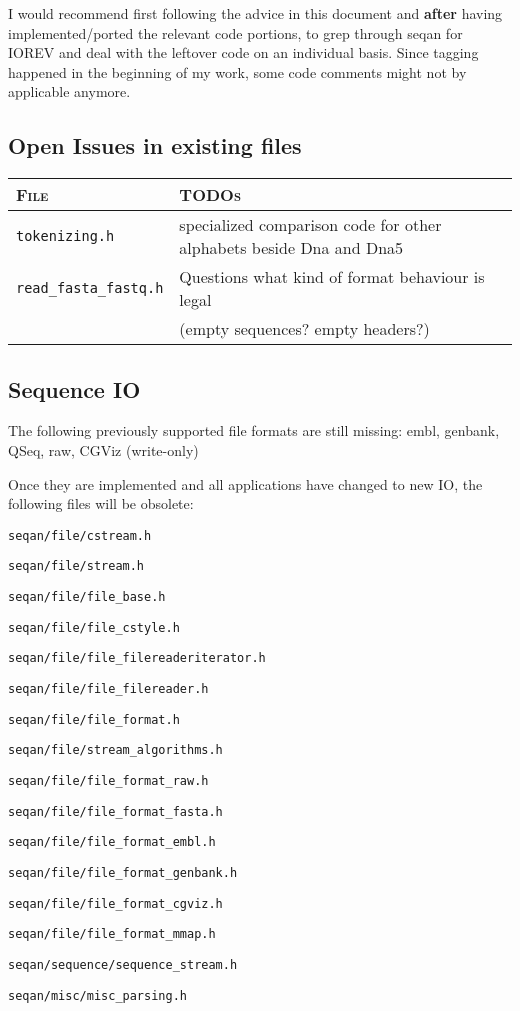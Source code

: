 \documentclass[a4paper,12pt]{scrartcl}
\newenvironment{packed_enum}{
\begin{enumerate}
  \setlength{\itemsep}{1pt}
  \setlength{\parskip}{0pt}
  \setlength{\parsep}{0pt}
}{\end{enumerate}}
\begin{document}
I would recommend first following the advice in this document and \textbf{after}
having
implemented/ported the relevant code portions, to grep through seqan for IOREV
and deal with the leftover code on an individual basis. Since tagging happened
in the beginning of my work, some code comments might not by applicable anymore.


\subsection{Open Issues in existing files}

\begin{tabular}{ll}\toprule
\textsc{File}	& \textsc{TODOs}		\\\midrule
\verb#tokenizing.h#    &specialized comparison code for other alphabets beside Dna and Dna5\\
\verb#read_fasta_fastq.h#     &Questions what kind of format behaviour is legal \\
&(empty sequences? empty headers?) \\\bottomrule
\end{tabular}





\subsection{Sequence IO}

The following previously supported file formats are still missing: embl, genbank, QSeq, raw, CGViz (write-only)

Once they are implemented and all applications have changed to new IO, the following 
files will be obsolete:
\begin{packed_enum}
\item \verb#seqan/file/cstream.h#
\item \verb#seqan/file/stream.h#
\item \verb#seqan/file/file_base.h#
\item \verb#seqan/file/file_cstyle.h#
\item \verb#seqan/file/file_filereaderiterator.h#
\item \verb#seqan/file/file_filereader.h#
\item \verb#seqan/file/file_format.h#
\item \verb#seqan/file/stream_algorithms.h#
\item \verb#seqan/file/file_format_raw.h#
\item \verb#seqan/file/file_format_fasta.h#
\item \verb#seqan/file/file_format_embl.h#
\item \verb#seqan/file/file_format_genbank.h#
\item \verb#seqan/file/file_format_cgviz.h#
\item \verb#seqan/file/file_format_mmap.h#
\item \verb#seqan/sequence/sequence_stream.h#
\item \verb#seqan/misc/misc_parsing.h#
\end{packed_enum}
\end{document}
